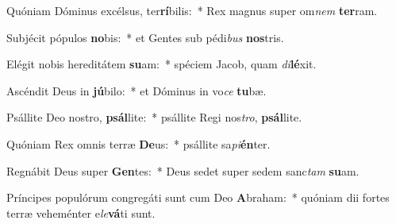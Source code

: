 \item Quóniam Dóminus excélsus, ter\textbf{rí}bilis:~* Rex magnus super om\textit{nem} \textbf{ter}ram.
\item Subjécit pópulos \textbf{no}bis:~* et Gentes sub pédi\textit{bus} \textbf{nos}tris.
\item Elégit nobis hereditátem \textbf{su}am:~* spéciem Jacob, quam \textit{di}\textbf{lé}xit.
\item Ascéndit Deus in \textbf{jú}bilo:~* et Dóminus in vo\textit{ce} \textbf{tu}bæ.
\item Psállite Deo nostro, \textbf{psál}lite:~* psállite Regi nos\textit{tro}, \textbf{psál}lite.
\item Quóniam Rex omnis terræ \textbf{De}us:~* psállite sa\textit{pi}\textbf{én}ter.
\item Regnábit Deus super \textbf{Gen}tes:~* Deus sedet super sedem sanc\textit{tam} \textbf{su}am.
\item Príncipes populórum congregáti sunt cum Deo \textbf{A}braham:~* quóniam dii fortes terræ veheménter e\textit{le}\textbf{vá}ti sunt.
